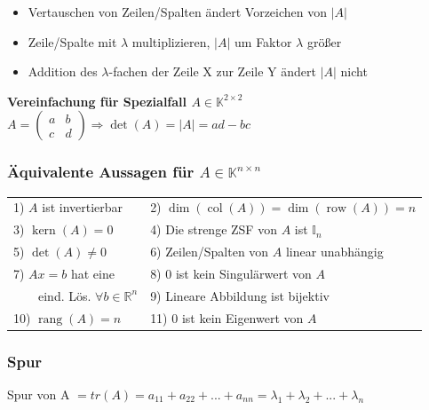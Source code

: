 \documentclass[8pt,a4paper]{scrartcl}
\DeclareMathOperator{\Kern}{kern}
\DeclareMathOperator{\rang}{rang}
\DeclareMathOperator{\col}{col}
\DeclareMathOperator{\row}{row}
\begin{document}
\begin{multicols*}{3}
				\begin{itemize}\itemsep0pt
					\item Vertauschen von Zeilen/Spalten ändert Vorzeichen von $|A|$
					\item Zeile/Spalte mit $\lambda$ multiplizieren, $|A|$ um Faktor $\lambda$ größer
					\item Addition des $\lambda$-fachen der Zeile X zur Zeile Y ändert $|A|$ nicht 
				\end{itemize}
				\textbf{Vereinfachung für Spezialfall $A\in \mathbb K^{2\times 2}$}\\
				$A=\begin{pmatrix}a&b\\c&d\end{pmatrix} \Rightarrow \det(A)=|A|=ad-bc$

			\subsubsection{Äquivalente Aussagen für $A\in \mathbb K^{n\times n}$}
				\begin{tabular}{ll}
					1)  $A$ ist invertierbar & 2) $\dim(\col(A))=\dim(\row(A))=n$\\
					3)  $\Kern(A)={0}$ & 4) Die strenge ZSF von $A$ ist $\mathbb{I}_n$\\
					5) $\det(A)\ne0$ & 6) Zeilen/Spalten von $A$ linear unabhängig\\
					7) $Ax=b$ hat eine & 8) 0 ist kein Singulärwert von $A$\\\ \ \ \ eind. Lös. $\forall b\in\mathbb{R}^n$ & 9) Lineare Abbildung ist bijektiv\\
					10)  $\rang(A)=n$ & 11) 0 ist kein Eigenwert von $A$\\

				\end{tabular}			
			
			\subsubsection{Spur}
  			Spur von A $= tr(A)=a_{11} +a_{22} +...+a_{nn} =\lambda_{1} +\lambda_{2} +...+\lambda_{n}$

    


\end{multicols*}

\end{document}
